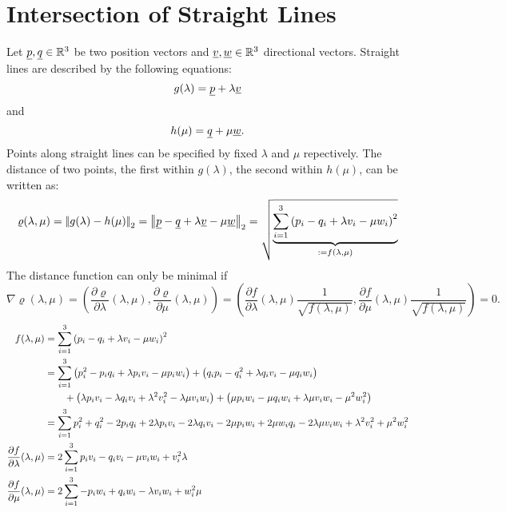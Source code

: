 \section{Intersection of Straight Lines}
Let $\vp, \vq \in \R^3$ be two position vectors and $\vv, \vw \in \R^3$
directional vectors. Straight lines are described by the following equations:
\begin{equation}
g(\lambda) = \vp + \lambda \vv \nn
\end{equation}
and
\begin{equation}
h(\mu) = \vq + \mu \vw. \nn
\end{equation}
Points along straight lines can be specified by fixed $\lambda$ and $\mu$
repectively. The distance of two points, the first within $g(\lambda)$, the
second within $h(\mu)$, can be written as:
\begin{equation*}
\varrho(\lambda, \mu) = \vnorm{g(\lambda) - h(\mu)}_2
	= \vnorm{\vp - \vq + \lambda \vv - \mu \vw}_2
	= \sqrt{\underbrace{\sum_{i=1}^3
		\left(p_i - q_i + \lambda v_i - \mu w_i \right)^2}_{:= f(\lambda,\mu)}}
\end{equation*}
The distance function can only be minimal if
\begin{equation*}
\nabla \varrho (\lambda, \mu) = \left(
	\dfrac{\partial \varrho}{\partial \lambda} (\lambda, \mu),
	\dfrac{\partial \varrho}{\partial \mu} (\lambda, \mu)
	\right)
	= \left(
	\dfrac{\partial f}{\partial \lambda}(\lambda, \mu)
		\dfrac{1}{\sqrt{f(\lambda, \mu)}},
	\dfrac{\partial f}{\partial \mu}(\lambda, \mu)
		\dfrac{1}{\sqrt{f(\lambda, \mu)}} \right) = 0.
\end{equation*}
\begin{align*}
f(\lambda, \mu)
	&= \sum_{i=1}^3 \left(p_i - q_i + \lambda v_i - \mu w_i \right)^2 \nonumber \\
	&= \sum_{i=1}^3 \left( p_i^2 - p_i q_i + \lambda p_i v_i - \mu p_i w_i \right)
		+ \left(q_i p_i - q_i^2 + \lambda q_i v_i - \mu q_i w_i \right) \nonumber \\
		&\qquad + \left(\lambda p_i v_i - \lambda q_i v_i + \lambda^2 v_i^2 - \lambda \mu v_i w_i \right)
		+ \left(\mu p_i w_i - \mu q_i w_i + \lambda \mu v_i w_i - \mu^2 w_i^2 \right) \nonumber \\
	&= \sum_{i=1}^3 p_i^2 + q_i^2 - 2 p_i q_i + 2 \lambda p_i v_i
		- 2 \lambda q_i v_i - 2 \mu p_i w_i + 2 \mu w_i q_i
		- 2 \lambda \mu v_i w_i + \lambda^2 v_i^2 + \mu^2 w_i^2 \\
\dfrac{\partial f}{\partial \lambda}(\lambda, \mu)
	&= 2 \sum_{i=1}^3 p_i v_i - q_i v_i - \mu v_i w_i + v_i^2 \lambda \\
\dfrac{\partial f}{\partial \mu}(\lambda, \mu)
	&= 2 \sum_{i=1}^3 - p_i w_i + q_i w_i - \lambda v_i w_i + w_i^2 \mu
\end{align*}
